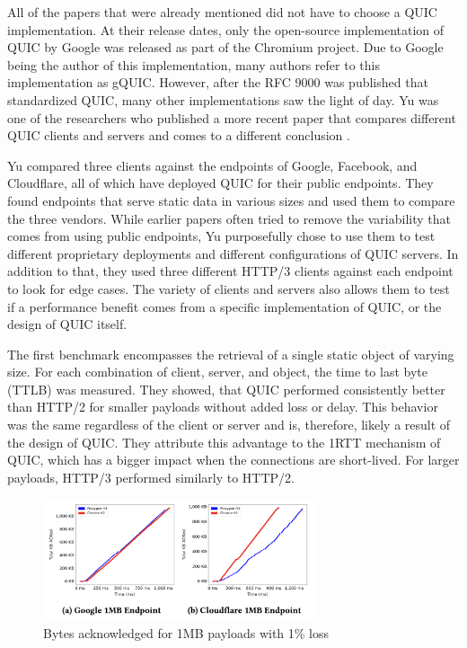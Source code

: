 \documentclass[conference]{IEEEtran}
\begin{document}

All of the papers that were already mentioned did not have to choose a QUIC implementation. At their release dates, only the open-source implementation of QUIC by Google was released as part of the Chromium project. Due to Google being the author of this implementation, many authors refer to this implementation as gQUIC. However, after the RFC 9000 was published that standardized QUIC, many other implementations saw the light of day. Yu was one of the researchers who published a more recent paper that compares different QUIC clients and servers and comes to a different conclusion \cite{Yu2}. 

Yu compared three clients against the endpoints of Google, Facebook, and Cloudflare, all of which have deployed QUIC for their public endpoints. They found endpoints that serve static data in various sizes and used them to compare the three vendors. While earlier papers often tried to remove the variability that comes from using public endpoints, Yu purposefully chose to use them to test different proprietary deployments and different configurations of QUIC servers. In addition to that, they used three different HTTP/3 clients against each endpoint to look for edge cases. The variety of clients and servers also allows them to test if a performance benefit comes from a specific implementation of QUIC, or the design of QUIC itself.

The first benchmark encompasses the retrieval of a single static object of varying size. For each combination of client, server, and object, the time to last byte (TTLB) was measured. They showed, that QUIC performed consistently better than HTTP/2 for smaller payloads without added loss or delay. This behavior was the same regardless of the client or server and is, therefore, likely a result of the design of QUIC. They attribute this advantage to the 1RTT mechanism of QUIC, which has a bigger impact when the connections are short-lived. For larger payloads, HTTP/3 performed similarly to HTTP/2.

\begin{figure}[htbp]
\includegraphics[width=8cm,keepaspectratio]{images/Yu2/Cloudflare anomaly.png}
\caption{Bytes acknowledged for 1MB payloads with 1\% loss \cite{Yu2}}
\label{fig:yu2-cloudflare-anomaly}
\end{figure}
\end{document}
